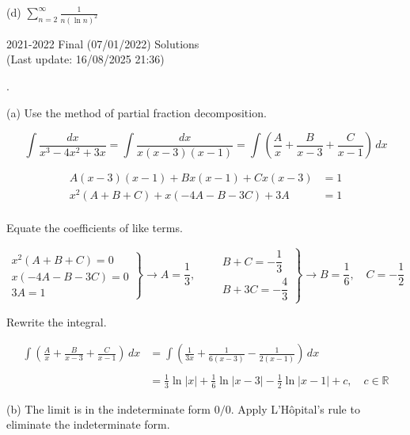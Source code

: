 \documentclass{article}
\begin{document}
\hfill

\hfill

\noindent (d) $\displaystyle\sum_{n=2}^\infty\frac1{n(\ln n)^2}$

\newpage

\begin{center}
2021-2022 Final (07/01/2022) Solutions\\
(Last update: 16/08/2025 21:36)
\end{center}

.

\hfill

\noindent (a) Use the method of partial fraction decomposition.

\[\int\frac{dx}{x^3-4x^2+3x}=\int\frac{dx}{x(x-3)(x-1)}=\int\left(\frac Ax+\frac B{x-3}+\frac C{x-1}\right)\,dx\]

\[\begin{array}{rc}A(x-3)(x-1)+Bx(x-1)+Cx(x-3)&=1\\x^2(A+B+C)+x(-4A-B-3C)+3A&=1\\&\end{array}\]

\hfill

\noindent Equate the coefficients of like terms.

\[\left.\begin{array}{r}
x^2(A+B+C)=0\\
x(-4A-B-3C)=0\\
3A=1
\end{array}\right\}\rightarrow A=\frac13,\qquad\left.\begin{array}{r}
B+C=-\dfrac13\\[1em]
B+3C=-\dfrac43
\end{array}\right\}\rightarrow B=\frac16,\quad C=-\frac12\]

\hfill

\noindent Rewrite the integral.

\begin{align*}
\int\left(\frac Ax+\frac B{x-3}+\frac C{x-1}\right)\,dx&=\int\left(\frac1{3x}+\frac1{6(x-3)}-\frac1{2(x-1)}\right)\,dx\\\\&=\boxed{\frac13\ln|x|+\frac16\ln|x-3|-\frac12\ln|x-1|+c,\quad c\in\mathbb{R}}
\end{align*}

\hfill

\noindent (b) The limit is in the indeterminate form $0/0$. Apply L'Hôpital's rule to eliminate the indeterminate form.
\end{document}
